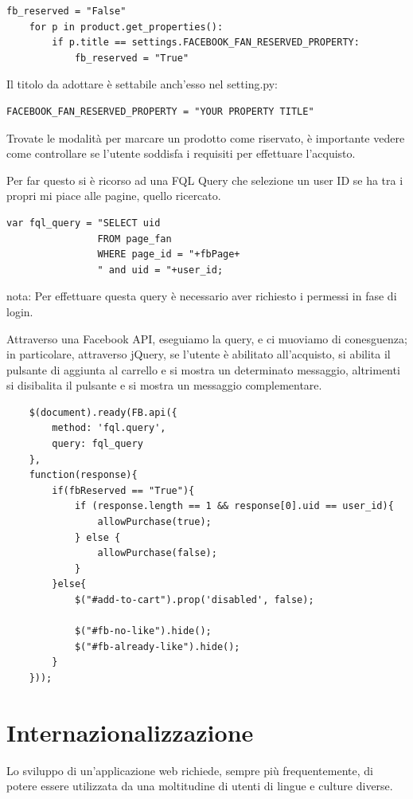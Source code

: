 \begin{lstlisting}
fb_reserved = "False"
    for p in product.get_properties():
        if p.title == settings.FACEBOOK_FAN_RESERVED_PROPERTY:
            fb_reserved = "True"
\end{lstlisting}

Il titolo da adottare è settabile anch'esso nel setting.py:

\begin{lstlisting}
FACEBOOK_FAN_RESERVED_PROPERTY = "YOUR PROPERTY TITLE"
\end{lstlisting}

Trovate le modalità per marcare un prodotto come riservato, è importante vedere come controllare se l'utente soddisfa i requisiti per effettuare l'acquisto.

Per far questo si è ricorso ad una FQL Query che selezione un user ID se ha tra i propri mi piace alle pagine, quello ricercato.

\begin{lstlisting}
var fql_query = "SELECT uid 
				FROM page_fan 
				WHERE page_id = "+fbPage+
				" and uid = "+user_id;
\end{lstlisting}

nota: Per effettuare questa query è necessario aver richiesto i permessi in fase di login. 

Attraverso una Facebook API, eseguiamo la query, e ci muoviamo di conesguenza; in particolare, attraverso jQuery, se l'utente è abilitato all'acquisto, si abilita il pulsante di aggiunta al carrello e si mostra un determinato messaggio, altrimenti si disibalita il pulsante e si mostra un messaggio complementare.


\begin{lstlisting}
    $(document).ready(FB.api({
        method: 'fql.query',
        query: fql_query
    },
    function(response){
        if(fbReserved == "True"){
            if (response.length == 1 && response[0].uid == user_id){
                allowPurchase(true);
            } else {
                allowPurchase(false);
            }
        }else{
            $("#add-to-cart").prop('disabled', false);

            $("#fb-no-like").hide();
            $("#fb-already-like").hide();
        }
    }));
\end{lstlisting}

\section{Internazionalizzazione}
Lo sviluppo di un’applicazione web richiede, sempre più frequentemente, di potere essere utilizzata da una moltitudine di utenti di lingue e culture diverse.

